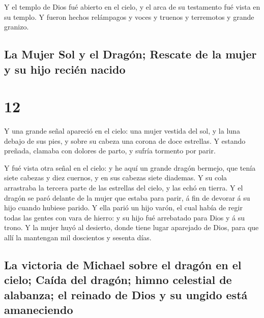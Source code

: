  Y el templo de Dios fué abierto en el cielo, y el arca
de su testamento fué vista en su templo. Y fueron hechos relámpagos y
voces y truenos y terremotos y grande granizo.

\hypertarget{la-mujer-sol-y-el-draguxf3n-rescate-de-la-mujer-y-su-hijo-reciuxe9n-nacido}{%
\subsection{La Mujer Sol y el Dragón; Rescate de la mujer y su hijo
recién
nacido}\label{la-mujer-sol-y-el-draguxf3n-rescate-de-la-mujer-y-su-hijo-reciuxe9n-nacido}}

\hypertarget{section-66-12}{%
\section{12}\label{section-66-12}}

 Y una grande señal apareció en el cielo: una mujer
vestida del sol, y la luna debajo de sus pies, y sobre su cabeza una
corona de doce estrellas.  Y estando preñada, clamaba con
dolores de parto, y sufría tormento por parir.

 Y fué vista otra señal en el cielo: y he aquí un grande
dragón bermejo, que tenía siete cabezas y diez cuernos, y en sus cabezas
siete diademas.  Y su cola arrastraba la tercera parte de
las estrellas del cielo, y las echó en tierra. Y el dragón se paró
delante de la mujer que estaba para parir, á fin de devorar á su hijo
cuando hubiese parido.  Y ella parió un hijo varón, el
cual había de regir todas las gentes con vara de hierro: y su hijo fué
arrebatado para Dios y á su trono.  Y la mujer huyó al
desierto, donde tiene lugar aparejado de Dios, para que allí la
mantengan mil doscientos y sesenta días.

\hypertarget{la-victoria-de-michael-sobre-el-draguxf3n-en-el-cielo-cauxedda-del-draguxf3n-himno-celestial-de-alabanza-el-reinado-de-dios-y-su-ungido-estuxe1-amaneciendo}{%
\subsection{La victoria de Michael sobre el dragón en el cielo; Caída
del dragón; himno celestial de alabanza; el reinado de Dios y su ungido
está
amaneciendo}\label{la-victoria-de-michael-sobre-el-draguxf3n-en-el-cielo-cauxedda-del-draguxf3n-himno-celestial-de-alabanza-el-reinado-de-dios-y-su-ungido-estuxe1-amaneciendo}}

